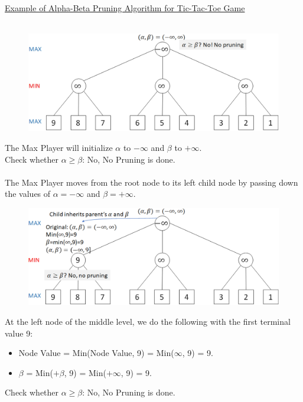 \documentclass{book}
\begin{document}
\uline{Example of Alpha-Beta Pruning Algorithm for Tic-Tac-Toe Game}\\
\\
\begin{figure}
    \includegraphics[scale=0.1]{chapter 10/ch10_figure3.jpeg}
\end{figure}
The Max Player will initialize $\alpha$ to $-\infty$ and $\beta$ to $+\infty$.\\
Check whether $\alpha \geq \beta$: No, No Pruning is done.\\
\vspace{2cm}
\\
The Max Player moves from the root node to its left child node by passing down the values of $\alpha = -\infty$ and $\beta = +\infty$.\\
\begin{figure}
    \includegraphics[scale=0.09]{chapter 10/ch10_figure4.jpeg}
\end{figure}
At the left node of the middle level, we do the following with the first terminal value 9:
\begin{itemize}
    \item Node Value = Min(Node Value, 9) = Min($\infty$, 9) = 9.
    \item $\beta$ = Min($+\beta$, 9) = Min($+\infty$, 9) = 9.
\end{itemize}
Check whether $\alpha \geq \beta$: No, No Pruning is done.\\
\end{document}
